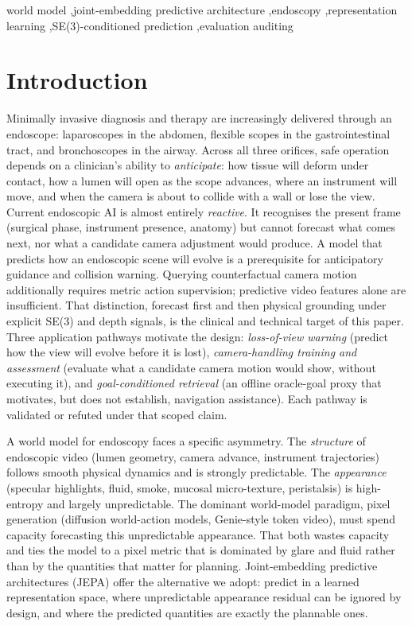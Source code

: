 \documentclass[preprint,12pt]{elsarticle}
\begin{document}
\begin{frontmatter}
\begin{keyword}
world model \sep joint-embedding predictive architecture \sep endoscopy \sep representation learning \sep SE(3)-conditioned prediction \sep evaluation auditing
\end{keyword}

\end{frontmatter}

\linenumbers

\section{Introduction}
\label{sec:intro}

Minimally invasive diagnosis and therapy are increasingly delivered through an endoscope: laparoscopes in the abdomen, flexible scopes in the gastrointestinal tract, and bronchoscopes in the airway.
Across all three orifices, safe operation depends on a clinician's ability to \emph{anticipate}: how tissue will deform under contact, how a lumen will open as the scope advances, where an instrument will move, and when the camera is about to collide with a wall or lose the view.
Current endoscopic AI is almost entirely \emph{reactive}.
It recognises the present frame (surgical phase, instrument presence, anatomy) but cannot forecast what comes next, nor what a candidate camera adjustment would produce.
A model that predicts how an endoscopic scene will evolve is a prerequisite for
anticipatory guidance and collision warning. Querying counterfactual camera
motion additionally requires metric action supervision; predictive video
features alone are insufficient. That distinction, forecast first and then
physical grounding under explicit SE(3) and depth signals, is the clinical and
technical target of this paper.
Three application pathways motivate the design: \emph{loss-of-view warning}
(predict how the view will evolve before it is lost), \emph{camera-handling
training and assessment} (evaluate what a candidate camera motion would show,
without executing it), and \emph{goal-conditioned retrieval} (an offline
oracle-goal proxy that motivates, but does not establish, navigation
assistance). Each pathway is validated or refuted under that scoped claim.

A world model for endoscopy faces a specific asymmetry.
The \emph{structure} of endoscopic video (lumen geometry, camera advance, instrument trajectories) follows smooth physical dynamics and is strongly predictable.
The \emph{appearance} (specular highlights, fluid, smoke, mucosal micro-texture, peristalsis) is high-entropy and largely unpredictable.
The dominant world-model paradigm, pixel generation (diffusion world-action models, Genie-style token video), must spend capacity forecasting this unpredictable appearance.
That both wastes capacity and ties the model to a pixel metric that is dominated by glare and fluid rather than by the quantities that matter for planning.
Joint-embedding predictive architectures (JEPA) offer the alternative we adopt: predict in a learned representation space, where unpredictable appearance residual can be ignored by design, and where the predicted quantities are exactly the plannable ones.
\end{document}
